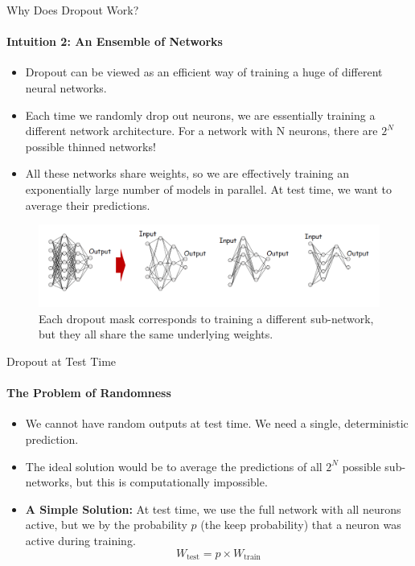 \begin{frame}{Why Does Dropout Work?}
    \framesubtitle{Intuition 2: An Ensemble of Networks}
    \small 
    \begin{itemize}
        \item Dropout can be viewed as an efficient way of training a huge  of different neural networks.
        \item Each time we randomly drop out neurons, we are essentially training a different network architecture. For a network with N neurons, there are $2^N$ possible thinned networks!
        \item All these networks share weights, so we are effectively training an exponentially large number of models in parallel. At test time, we want to average their predictions.
    \end{itemize}
    \begin{figure}
        \centering
        \includegraphics[width=\linewidth]{images/dropout_ensemble.png}
        \caption{Each dropout mask corresponds to training a different sub-network, but they all share the same underlying weights.}
    \end{figure}
\end{frame}

\begin{frame}{Dropout at Test Time}
    \framesubtitle{The Problem of Randomness}
    \begin{itemize}
        \item We cannot have random outputs at test time. We need a single, deterministic prediction.
        \item The ideal solution would be to average the predictions of all $2^N$ possible sub-networks, but this is computationally impossible.
        \item \textbf{A Simple Solution:} At test time, we use the full network with all neurons active, but we  by the probability $p$ (the keep probability) that a neuron was active during training.
        \[ W_{\text{test}} = p \times W_{\text{train}} \]
    \end{itemize}
\end{frame}

